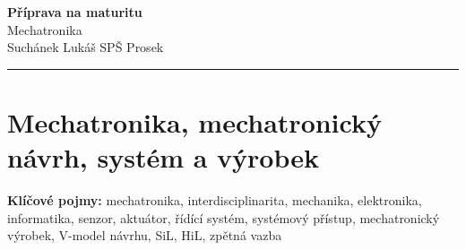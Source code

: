 \documentclass[a4paper,10pt]{article}
\begin{document}
\begin{minipage}[t]{0.75\textwidth}
    {\Huge\bfseries\color{accent} Příprava na maturitu}\\[4pt]
    {\large\color{stripeblue} Mechatronika}\\[2pt]
    \textcolor{medgray}{\small Suchánek Lukáš \quad SPŠ Prosek }
\end{minipage}
\hfill
\begin{minipage}[t]{0.22\textwidth}
    \raggedleft
\end{minipage}

\vspace{6pt}
\noindent\color{accent}\rule{\linewidth}{1.5pt}
\vspace{2pt}

\section{Mechatronika, mechatronický návrh, systém a výrobek}

\begin{pojmybox}
\textbf{Klíčové pojmy:}
mechatronika, interdisciplinarita, mechanika, elektronika, informatika,
senzor, aktuátor, řídící systém, systémový přístup, mechatronický výrobek,
V-model návrhu, SiL, HiL, zpětná vazba
\end{pojmybox}
\end{document}
